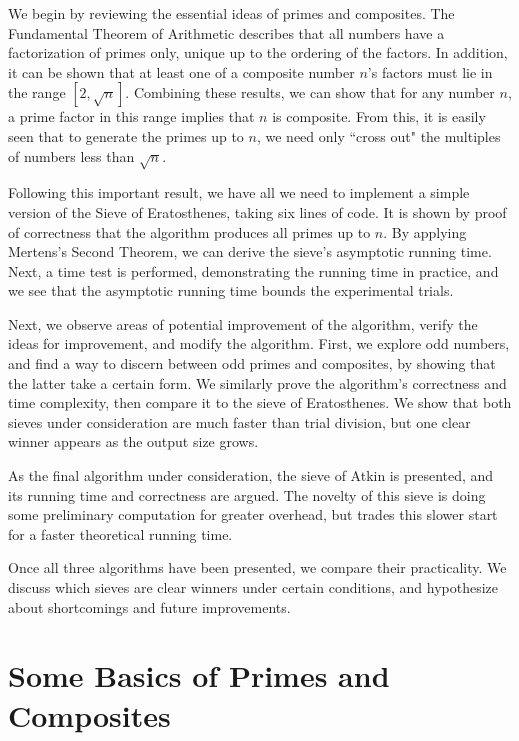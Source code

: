 \documentclass{amsart}
\theoremstyle{definition}
\theoremstyle{case}
\begin{document}
    We begin by reviewing the essential ideas of primes and composites. The Fundamental Theorem of Arithmetic describes that all numbers have a factorization of primes only, unique up to the ordering of the factors. In addition, it can be shown that at least one of a composite number $n$'s factors must lie in the range $[2, \sqrt{n}]$. Combining these results, we can show that for any number $n$, a prime factor in this range implies that $n$ is composite. From this, it is easily seen that to generate the primes up to $n$, we need only ``cross out" the multiples of numbers less than $\sqrt{n}$.
    
    Following this important result, we have all we need to implement a simple version of the Sieve of Eratosthenes, taking six lines of code. It is shown by proof of correctness that the algorithm produces all primes up to $n$. By applying Mertens's Second Theorem, we can derive the sieve's asymptotic running time. Next, a time test is performed, demonstrating the running time in practice, and we see that the asymptotic running time bounds the experimental trials.
    
    Next, we observe areas of potential improvement of the algorithm, verify the ideas for improvement, and modify the algorithm. First, we explore odd numbers, and find a way to discern between odd primes and composites, by showing that the latter take a certain form. We similarly prove the algorithm's correctness and time complexity, then compare it to the sieve of Eratosthenes. We show that both sieves under consideration are much faster than trial division, but one clear winner appears as the output size grows.
    
    As the final algorithm under consideration, the sieve of Atkin is presented, and its running time and correctness are argued. The novelty of this sieve is doing some preliminary computation for greater overhead, but trades this slower start for a faster theoretical running time.
    
    Once all three algorithms have been presented, we compare their practicality. We discuss which sieves are clear winners under certain conditions, and hypothesize about shortcomings and future improvements.
    
    
    \section{Some Basics of Primes and Composites}
    
	
\end{document}
